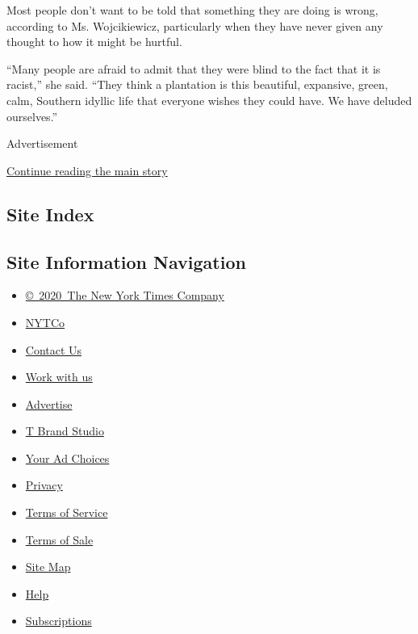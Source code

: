 Most people don't want to be told that something they are doing is
wrong, according to Ms. Wojcikiewicz, particularly when they have never
given any thought to how it might be hurtful.

``Many people are afraid to admit that they were blind to the fact that
it is racist,'' she said. ``They think a plantation is this beautiful,
expansive, green, calm, Southern idyllic life that everyone wishes they
could have. We have deluded ourselves.''

Advertisement

\protect\hyperlink{after-bottom}{Continue reading the main story}

\hypertarget{site-index}{%
\subsection{Site Index}\label{site-index}}

\hypertarget{site-information-navigation}{%
\subsection{Site Information
Navigation}\label{site-information-navigation}}

\begin{itemize}
\tightlist
\item
  \href{https://help.nytimes.com/hc/en-us/articles/115014792127-Copyright-notice}{©~2020~The
  New York Times Company}
\end{itemize}

\begin{itemize}
\tightlist
\item
  \href{https://www.nytco.com/}{NYTCo}
\item
  \href{https://help.nytimes.com/hc/en-us/articles/115015385887-Contact-Us}{Contact
  Us}
\item
  \href{https://www.nytco.com/careers/}{Work with us}
\item
  \href{https://nytmediakit.com/}{Advertise}
\item
  \href{http://www.tbrandstudio.com/}{T Brand Studio}
\item
  \href{https://www.nytimes.com/privacy/cookie-policy\#how-do-i-manage-trackers}{Your
  Ad Choices}
\item
  \href{https://www.nytimes.com/privacy}{Privacy}
\item
  \href{https://help.nytimes.com/hc/en-us/articles/115014893428-Terms-of-service}{Terms
  of Service}
\item
  \href{https://help.nytimes.com/hc/en-us/articles/115014893968-Terms-of-sale}{Terms
  of Sale}
\item
  \href{https://spiderbites.nytimes.com}{Site Map}
\item
  \href{https://help.nytimes.com/hc/en-us}{Help}
\item
  \href{https://www.nytimes.com/subscription?campaignId=37WXW}{Subscriptions}
\end{itemize}
